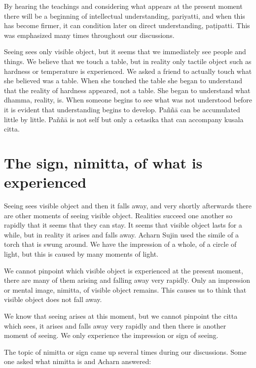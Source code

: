\documentclass{book}
\begin{document}
By hearing the teachings and considering
what appears at the present moment there will be a beginning of
intellectual understanding, pariyatti, and when this has become firmer,
it can condition later on direct understanding, paṭipatti. This was
emphasized many times throughout our discussions. 

Seeing sees only visible object, but it
seems that we immediately see people and things. We believe that we
touch a table, but in reality only tactile object such as hardness or
temperature is experienced. We asked a friend to actually touch what she
believed was a table. When she touched the table she began to understand
that the reality of hardness appeared, not a table. She began to
understand what dhamma, reality, is. When someone begins to see what was
not understood before it is evident that understanding begins to
develop. Paññā can be accumulated little by little. Paññā is not self
but only a cetasika that can accompany kusala citta. 






\section*{The sign, nimitta, of what is experienced}


Seeing sees visible object and then it falls away, and very
shortly afterwards there are other moments of seeing visible object.
Realities succeed one another so rapidly that it seems that they can
stay. It seems that visible object lasts
for a while, but in reality it arises and
falls away. Acharn Sujin used the simile
of a torch that is swung around. We
have the impression of a whole, of a
circle of light, but this is caused by
many moments of light. 

We cannot pinpoint which visible object
is experienced at the
present moment, there are many of them arising and falling
away very rapidly. Only an
impression or mental image, nimitta, of visible
object remains. This
causes us to think that
visible object does not fall
away. 

We know that seeing arises at this
moment, but we cannot pinpoint the 
citta which
sees, it arises and falls away very rapidly and then there is
another moment of seeing. We
only experience the impression or sign of seeing. 

The topic of nimitta or sign came up
several times during our discussions. Some one asked
what nimitta is and Acharn
answered:
\end{document}
